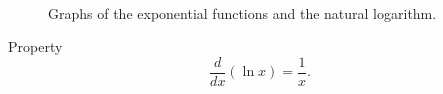 \begin{figure}[H]
    \hspace{0.2cm}
    \hspace{2.0cm}
     \\
    \centering
  \caption{Graphs of the exponential functions and the natural logarithm.}
  \label{fig:exp-log-graphs}
\end{figure}

\begin{thing}{Property}
\[\frac{d}{dx}(\ln x)=\frac{1}{x}.\]
\end{thing}

